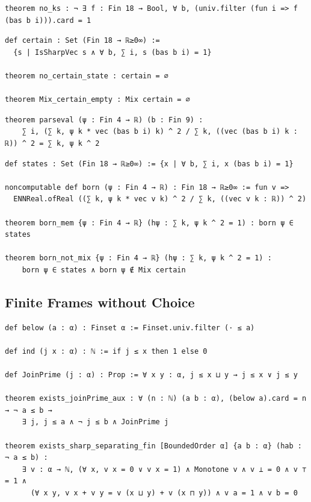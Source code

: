 \label{lean:no-ks}
\begin{lstlisting}
theorem no_ks : ¬ ∃ f : Fin 18 → Bool, ∀ b, (univ.filter (fun i => f (bas b i))).card = 1
\end{lstlisting}

\label{lean:no-certain-state}
\begin{lstlisting}
def certain : Set (Fin 18 → ℝ≥0∞) :=
  {s | IsSharpVec s ∧ ∀ b, ∑ i, s (bas b i) = 1}

theorem no_certain_state : certain = ∅

theorem Mix_certain_empty : Mix certain = ∅
\end{lstlisting}

\label{lean:parseval}
\begin{lstlisting}
theorem parseval (ψ : Fin 4 → ℝ) (b : Fin 9) :
    ∑ i, (∑ k, ψ k * vec (bas b i) k) ^ 2 / ∑ k, ((vec (bas b i) k : ℝ)) ^ 2 = ∑ k, ψ k ^ 2
\end{lstlisting}

\label{lean:born-not-mix}
\begin{lstlisting}
def states : Set (Fin 18 → ℝ≥0∞) := {x | ∀ b, ∑ i, x (bas b i) = 1}

noncomputable def born (ψ : Fin 4 → ℝ) : Fin 18 → ℝ≥0∞ := fun v =>
  ENNReal.ofReal ((∑ k, ψ k * vec v k) ^ 2 / ∑ k, ((vec v k : ℝ)) ^ 2)

theorem born_mem {ψ : Fin 4 → ℝ} (hψ : ∑ k, ψ k ^ 2 = 1) : born ψ ∈ states

theorem born_not_mix {ψ : Fin 4 → ℝ} (hψ : ∑ k, ψ k ^ 2 = 1) :
    born ψ ∈ states ∧ born ψ ∉ Mix certain
\end{lstlisting}

\subsection{Finite Frames without Choice}

\label{lean:exists-sharp-separating-fin}
\begin{lstlisting}
def below (a : α) : Finset α := Finset.univ.filter (· ≤ a)

def ind (j x : α) : ℕ := if j ≤ x then 1 else 0

def JoinPrime (j : α) : Prop := ∀ x y : α, j ≤ x ⊔ y → j ≤ x ∨ j ≤ y

theorem exists_joinPrime_aux : ∀ (n : ℕ) (a b : α), (below a).card = n → ¬ a ≤ b →
    ∃ j, j ≤ a ∧ ¬ j ≤ b ∧ JoinPrime j

theorem exists_sharp_separating_fin [BoundedOrder α] {a b : α} (hab : ¬ a ≤ b) :
    ∃ v : α → ℕ, (∀ x, v x = 0 ∨ v x = 1) ∧ Monotone v ∧ v ⊥ = 0 ∧ v ⊤ = 1 ∧
      (∀ x y, v x + v y = v (x ⊔ y) + v (x ⊓ y)) ∧ v a = 1 ∧ v b = 0
\end{lstlisting}

